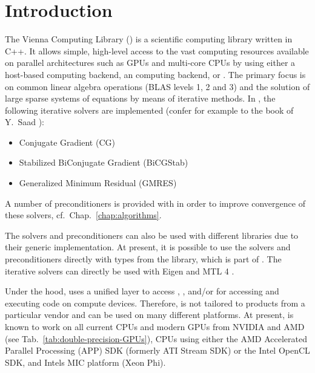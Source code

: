 
\chapter*{Introduction}   

The Vienna Computing Library (\ViennaCL) is a scientific computing
library written in C++. It allows simple, high-level access
to the vast computing resources available on parallel architectures such as
GPUs and multi-core CPUs by using either a host-based computing backend, an {\OpenCL} computing backend, or {\CUDA}.
The primary focus is on common linear algebra
operations (BLAS levels 1, 2 and 3) and the solution of large sparse systems of equations by means of iterative
methods. In {\ViennaCLminorversion}, the following iterative solvers are
implemented (confer for example to the book of Y.~Saad \cite{saad-iterative-solution}):
\begin{itemize}
 \item Conjugate Gradient (CG)
 \item Stabilized BiConjugate Gradient (BiCGStab)
 \item Generalized Minimum Residual (GMRES)
\end{itemize}
A number of preconditioners is provided with {\ViennaCLversion} in order to improve convergence of these solvers, cf.~Chap.~\ref{chap:algorithms}.

The solvers and preconditioners can also be used with different
libraries due to their generic implementation. At present, it is possible to
use the solvers and preconditioners directly with types from the {\ublas} library, which is part of
{\Boost} \cite{boost}. The iterative solvers can directly be used with Eigen \cite{eigen} and MTL 4 \cite{mtl4}.

Under the hood, {\ViennaCL} uses a unified layer to access {\CUDA} \cite{nvidiacuda}, {\OpenCL} \cite{khronoscl}, and/or {\OpenMP} \cite{openmp} for accessing and
executing code on compute devices. Therefore, {\ViennaCL} is not tailored
to products from a particular vendor and can be used on many different
platforms. At present, {\ViennaCL} is known to work on all current CPUs and modern GPUs from NVIDIA
and AMD (see Tab.~\ref{tab:double-precision-GPUs}), CPUs
using either the AMD Accelerated Parallel Processing (APP) SDK (formerly ATI Stream SDK) or the Intel OpenCL SDK, and Intels MIC platform (Xeon Phi).


